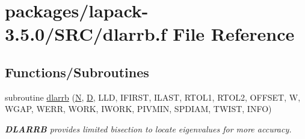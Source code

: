 \hypertarget{dlarrb_8f}{}\section{packages/lapack-\/3.5.0/\+S\+R\+C/dlarrb.f File Reference}
\label{dlarrb_8f}
\subsection*{Functions/\+Subroutines}
\begin{DoxyCompactItemize}
\item 
subroutine \hyperlink{group__auxOTHERauxiliary_gab3446b2d3189e23e5b95f18ea97b0a22}{dlarrb} (\hyperlink{polmisc_8c_a0240ac851181b84ac374872dc5434ee4}{N}, \hyperlink{odrpack_8h_a7dae6ea403d00f3687f24a874e67d139}{D}, L\+L\+D, I\+F\+I\+R\+S\+T, I\+L\+A\+S\+T, R\+T\+O\+L1, R\+T\+O\+L2, O\+F\+F\+S\+E\+T, W, W\+G\+A\+P, W\+E\+R\+R, W\+O\+R\+K, I\+W\+O\+R\+K, P\+I\+V\+M\+I\+N, S\+P\+D\+I\+A\+M, T\+W\+I\+S\+T, I\+N\+F\+O)
\begin{DoxyCompactList}\small\item\em {\bfseries D\+L\+A\+R\+R\+B} provides limited bisection to locate eigenvalues for more accuracy. \end{DoxyCompactList}\end{DoxyCompactItemize}
